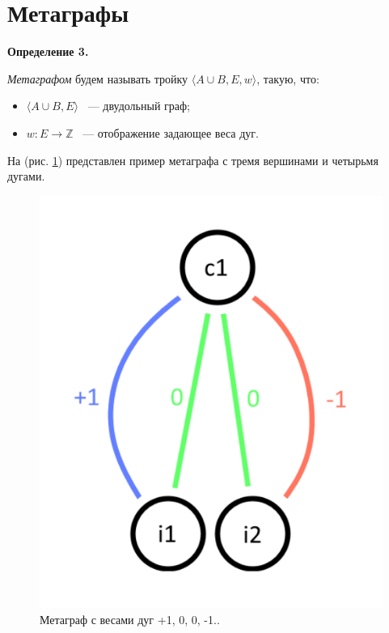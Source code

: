 \documentclass[14pt]{mmcs-article}
\begin{document}
\pagebreak
\section*{Метаграфы}

\textbf{Определение 3.}

\textsl{Метаграфом} будем называть тройку $\langle A \cup B,E,w \rangle$, такую, что:

\begin{itemize}
    \item $\langle A \cup B,E \rangle$ ~--- двудольный граф;
    \item $w: E \rightarrow \mathbb{Z}$ ~--- отображение задающее веса дуг.
\end{itemize}

На (рис. \ref{image:2}) представлен пример метаграфа с тремя вершинами и четырьмя дугами.

\begin{figure}[H]
    \centering
    \includegraphics[scale=0.4]{Fig_2.png}
    \caption{ Метаграф с весами дуг +1, 0, 0, -1.. }
    \label{image:2}
\end{figure}
\end{document}

